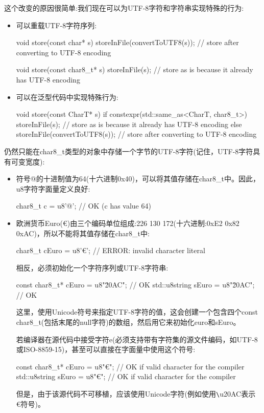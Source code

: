 这个改变的原因很简单:我们现在可以为UTF-8字符和字符串实现特殊的行为:

\begin{itemize}
\item 
可以重载UTF-8字符序列:

\begin{cpp}
void store(const char* s)
{
	storeInFile(convertToUTF8(s)); // store after converting to UTF-8 encoding
}

void store(const char8_t* s)
{
	storeInFile(s); // store as is because it already has UTF-8 encoding
}
\end{cpp}

\item 
可以在泛型代码中实现特殊行为:

\begin{cpp}
void store(const CharT* s)
{
	if constexpr(std::same_as<CharT, char8_t>) {
		storeInFile(s); // store as is because it already has UTF-8 encoding
	}
	else {
		storeInFile(convertToUTF8(s)); // store after converting to UTF-8 encoding
	}
}
\end{cpp}

\end{itemize}

仍然只能在char8\_t类型的对象中存储一个字节的UTF-8字符(记住，UTF-8字符具有可变宽度):

\begin{itemize}
\item 
符号@的十进制值为64(十六进制0x40)，可以将其值存储在char8\_t中。因此，u8字符字面量定义良好:

\begin{cpp}
char8_t c = u8'@'; // OK (c has value 64)
\end{cpp}

\item 
欧洲货币Euro(€)由三个编码单位组成:226 130 172(十六进制:0xE2 0x82 0xAC)，所以不能将其值存储在char8\_t中:

\begin{cpp}
char8_t cEuro = u8'€'; // ERROR: invalid character literal
\end{cpp}

相反，必须初始化一个字符序列或UTF-8字符串:

\begin{cpp}
const char8_t* cEuro = u8"\u20AC"; // OK
std::u8string sEuro = u8"\u20AC"; // OK
\end{cpp}

这里，使用Unicode符号来指定UTF-8字符的值，这会创建一个包含四个const char8\_t(包括末尾的null字符)的数组，然后用它来初始化euro和sEuro。

若编译器在源代码中接受字符e(必须支持带有字符集的源文件编码，如UTF-8或ISO-8859-15)，甚至可以直接在字面量中使用这个符号:

\begin{cpp}
const char8_t* cEuro = u8"€"; // OK if valid character for the compiler
std::u8string sEuro = u8"€"; // OK if valid character for the compiler
\end{cpp}

但是，由于该源代码不可移植，应该使用Unicode字符(例如使用\verb|\|u20AC表示€符号)。

\end{itemize}

